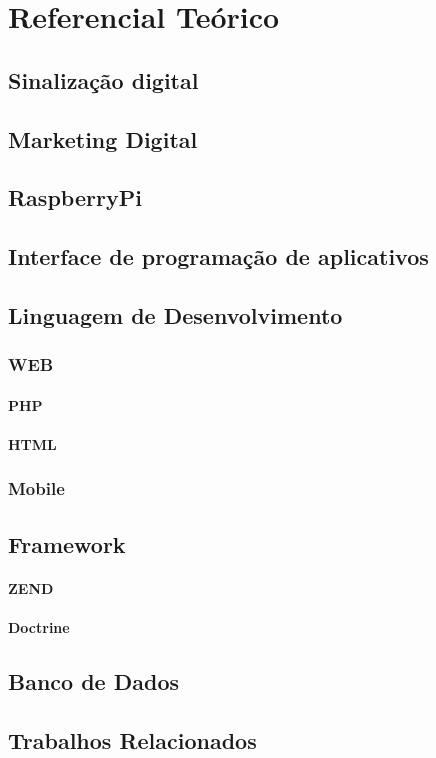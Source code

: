 
\chapter[Referencial Teórico]{Referencial Teórico}
\section{Sinalização digital}
\section{Marketing Digital}
\section{RaspberryPi}
\section{Interface de programação de aplicativos}

\section{Linguagem de Desenvolvimento}
\subsection{WEB}

\subsubsection{PHP}

\subsubsection{HTML}

\subsection{Mobile}

\section{Framework}
\subsubsection{ZEND}
\subsubsection{Doctrine}
\section{Banco de Dados}
\section{Trabalhos Relacionados}


